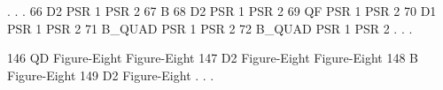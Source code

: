 { 
\begin{ptccode}
     .
     .
     .
  66 D2              
PSR 1                                                                                                                   
PSR 2                                                                                                                   
  67 B           \label{lin:b:nil}     
  68 D2             
PSR 1                                                                                                                   
PSR 2                                                                                                                   
  69 QF         \label{lin:qf:psr}      
PSR 1                                                                                                                   
PSR 2                                                                                                                   
  70 D1              
PSR 1                                                                                                                   
PSR 2                                                                                                                   
  71 B_QUAD      \label{lin:b:q}         
PSR 1                                                                                                                   
PSR 2                                                                                                                   
  72 B_QUAD          
PSR 1                                                                                                                   
PSR 2                                                                                                                   
     .
     .
     .

 146 QD           \label{lin:qd:8}        
Figure-Eight                                                                                                            
Figure-Eight                                                                                                            
 147 D2              
Figure-Eight                                                                                                            
Figure-Eight                                                                                                            
 148 B               
Figure-Eight                                                                                                            
 149 D2              
Figure-Eight                                                                                                            
     .
     .
     .
\end{ptccode}
}


